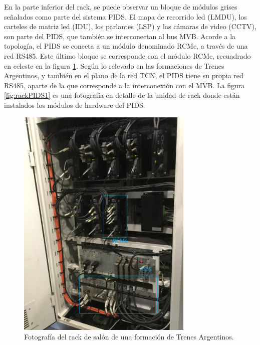 En la parte inferior del rack, se puede observar un bloque de módulos grises señalados como parte del sistema PIDS. El mapa de recorrido led (LMDU), los carteles de matriz led (IDU), los parlantes (LSP) y las cámaras de video (CCTV), son parte del PIDS, que también se interconectan al bus MVB. Acorde a la topología, el PIDS se conecta a un módulo denominado RCMe, a través de una red RS485. Este último bloque se corresponde con el módulo RCMe, recuadrado en celeste en la figura \ref{fig:imgRackTCN}.  Según lo relevado en las formaciones de Trenes Argentinos, y también en el plano de la red TCN, el PIDS tiene su propia red RS485, aparte de la que corresponde a la interconexión con el MVB. La figura \ref{fig:rackPIDS1} es una fotografía en detalle de la unidad de rack donde están instalados los módulos de hardware del PIDS. \\

\begin{figure}[htbp]
	\centering
	\includegraphics[width=0.75\textwidth , angle=0]{./Figures/imgRackTCN.JPG}
	\caption{Fotografía del rack de salón de una formación de Trenes Argentinos.}
	\label{fig:imgRackTCN}
\end{figure}

